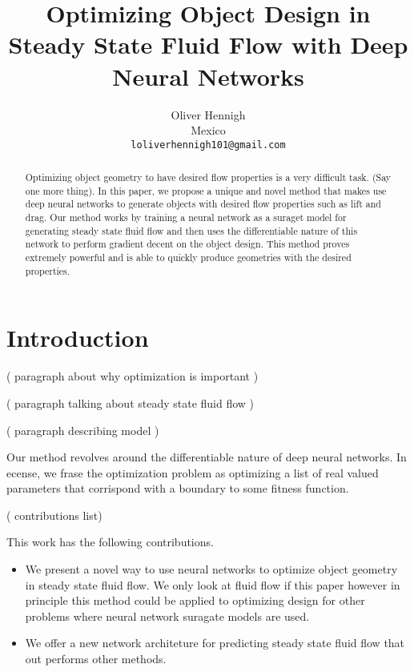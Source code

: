 \documentclass{article}
\title{Optimizing Object Design in Steady State Fluid Flow with Deep Neural Networks}
\author{
  Oliver Hennigh \\
  Mexico \\
  \texttt{loliverhennigh101@gmail.com} \\
}
\begin{document}

\maketitle

\begin{abstract}

Optimizing object geometry to have desired flow properties is a very difficult task. (Say one more thing). In this paper, we propose a unique and novel method that makes use deep neural networks to generate objects with desired flow properties such as lift and drag. Our method works by training a neural network as a suraget model for generating steady state fluid flow and then uses the differentiable nature of this network to perform gradient decent on the object design. This method proves extremely powerful and is able to quickly produce geometries with the desired properties.

\end{abstract}

\section{Introduction}

( paragraph about why optimization is important )

( paragraph talking about steady state fluid flow )

( paragraph describing model )

Our method revolves around the differentiable nature of deep neural networks. In ecense, we frase the optimization problem as optimizing a list of real valued parameters that corrispond with a boundary to some fitness function. 

( contributions list)

This work has the following contributions.
\begin{itemize}
  \item We present a novel way to use neural networks to optimize object geometry in steady state fluid flow. We only look at fluid flow if this paper however in principle this method could be applied to optimizing design for other problems where neural network suragate models are used.
  \item We offer a new network architeture for predicting steady state fluid flow that out performs other methods.
\end{itemize}
\end{document}
